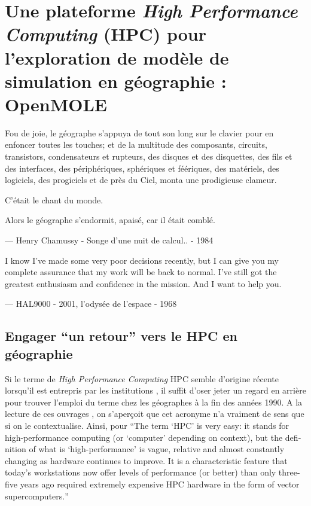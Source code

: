 
\newcommand\litem[1]{\item{\bfseries #1,\enspace}}

\section{Une plateforme \textit{High Performance Computing} (HPC) pour l'exploration de modèle de simulation en géographie : OpenMOLE}
\label{sec:retourgeoHPCopenmole}

\epigraph {Fou de joie, le géographe s'appuya de tout son long sur le clavier pour en enfoncer toutes les touches; et de la multitude des composants, circuits, transistors, condensateurs et rupteurs, des disques et des disquettes, des fils et des interfaces, des périphériques, sphériques et féériques, des matériels, des logiciels, des progiciels et de près du Ciel, monta une prodigieuse clameur.

C'était le chant du monde.

Alors le géographe s'endormit, apaisé, car il était comblé.}{ --- \textup{Henry Chamussy - Songe d'une nuit de calcul.. - 1984}}

\epigraph {I know I've made some very poor decisions recently, but I can give you my complete assurance that my work will be back to normal. I've still got the greatest enthusiasm and confidence in the mission. And I want to help you.}{ --- \textup{HAL9000 - 2001, l'odysée de l'espace  - 1968}}

\subsection{Engager \enquote{un retour} vers le HPC en géographie}
\label{ssec:retourHPC}

Si le terme de \textit{High Performance Computing} HPC semble d'origine récente lorsqu'il est entrepris par les institutions \autocite{HPCHorizon2020}, il suffit d'oser jeter un regard en arrière pour trouver l'emploi du terme chez les géographes à la fin des années 1990. A la lecture de ces ouvrages \autocites{Turton1998, Openshaw2000, Openshaw2000b}, on s'aperçoit que cet acronyme n'a vraiment de sens que si on le contextualise. Ainsi, pour \textcite{Openshaw2000} \foreignquote{english}{The term \enquote{HPC} is very easy: it stands for high-performance computing (or \enquote{computer} depending on context), but the definition of what is \enquote{high-performance} is vague, relative and almost constantly changing as hardware continues to improve. It is a characteristic feature that today's workstations now offer levels of performance (or better) than only three-five years ago required extremely expensive HPC hardware in the form of vector supercomputers.}

